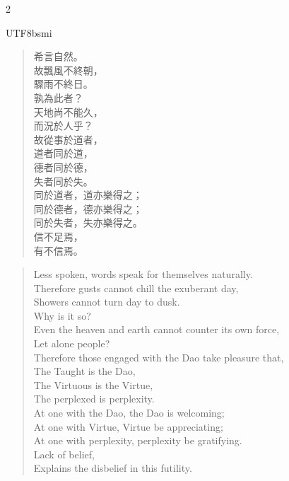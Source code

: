 \begin{paracol}{2}
\begin{CJK*}{UTF8}{bsmi}
\begin{verse}
希言自然。\\ 
故飄風不終朝，\\ 
驟雨不終日。\\ 
孰為此者？\\ 
天地尚不能久，\\ 
而況於人乎？\\ 
故從事於道者，\\ 
道者同於道，\\ 
德者同於德，\\ 
失者同於失。\\ 
同於道者，道亦樂得之；\\ 
同於德者，德亦樂得之；\\ 
同於失者，失亦樂得之。\\ 
信不足焉，\\ 
有不信焉。
\end{verse}
\end{CJK*}
\switchcolumn
\vspace*{-2ex}
\begin{verse}
Less spoken, words speak for themselves naturally.\\ 
Therefore gusts cannot chill the exuberant day,\\ 
Showers cannot turn day to dusk.\\ 
Why is it so?\\ 
Even the heaven and earth cannot counter its own force,\\ 
Let alone people?\\ 
Therefore those engaged with the Dao take pleasure that,\\ 
The Taught is the Dao,\\ 
The Virtuous is the Virtue,\\ 
The perplexed is perplexity.\\ 
At one with the Dao, the Dao is welcoming;\\ 
At one with Virtue, Virtue be appreciating;\\ 
At one with perplexity, perplexity be gratifying.\\ 
Lack of belief,\\ 
Explains the disbelief in this futility.
\end{verse}
\end{paracol}


